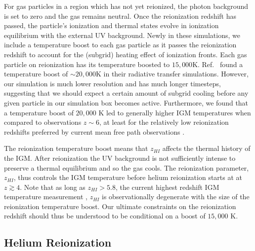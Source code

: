 \documentclass[a4paper,11pt]{article}
\begin{document}
For gas particles in a region which has not yet reionized, the photon background is set to zero and the gas remains neutral. Once the reionization redshift has passed, the particle's ionization and thermal states evolve in ionization equilibrium with the external UV background. Newly in these simulations, we include a temperature boost to each gas particle as it passes the reionization redshift to account for the (subgrid) heating effect of ionization fronts.
Each gas particle on reionization has its temperature boosted to $15,000$K.
Ref.~\citep{DAloisio:2019} found a temperature boost of $\sim 20,000$K in their radiative transfer simulations. However, our simulation is much lower resolution and has much longer timesteps, suggesting that we should expect a certain amount of subgrid cooling before any given particle in our simulation box becomes active. Furthermore, we found that a temperature boost of $20,000$ K led to generally higher IGM temperatures when compared to observations $z\sim 6$, at least for the relatively low reionization redshifts preferred by current mean free path observations \cite{Cain:2021}.

The reionization temperature boost means that $z_{HI}$ affects the thermal history of the IGM. After reionization the UV background is not sufficiently intense to preserve a thermal equilibrium and so the gas cools. The reionization parameter, $z_{HI}$, thus controls the IGM temperature before helium reionization starts at at $z \gtrsim 4$. Note that as long as $z_{HI} > 5.8$, the current highest redshift IGM temperature measurement \cite{Gaikwad:2020}, $z_{HI}$ is observationally degenerate with the size of the reionization temperature boost. Our ultimate constraints on the reionization redshift should thus be understood to be conditional on a boost of $15,000$ K.


\subsection{Helium Reionization}
\label{sec:helium}
\end{document}
